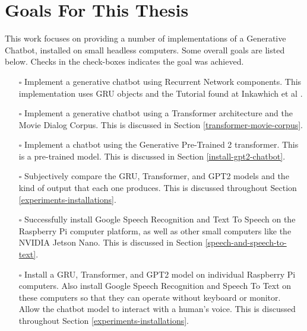 
\section{Goals For This Thesis}
This work focuses on providing a number of implementations of a Generative Chatbot, installed on small headless computers. Some overall goals are listed below. Checks in the check-boxes indicates the goal was achieved.

\begin{itemize}
	
	\item[\rlap{\raisebox{0.3ex}{\hspace{0.4ex}\tiny \ding{52}}}$\square$] Implement a generative chatbot using Recurrent Network components. This implementation uses GRU objects and the Tutorial found at Inkawhich et al \cite{2018Inkawhich}.
	
	\item[\rlap{\raisebox{0.3ex}{\hspace{0.4ex}\tiny \ding{52}}}$\square$] Implement a generative chatbot using a Transformer architecture and the Movie Dialog Corpus. This is discussed in Section \ref{transformer-movie-corpus}. %
	
	\item[\rlap{\raisebox{0.3ex}{\hspace{0.4ex}\tiny \ding{52}}}$\square$] Implement a chatbot using the Generative Pre-Trained 2 transformer. This is a pre-trained model. This is discussed in Section \ref{install-gpt2-chatbot}.
	
	\item[\rlap{\raisebox{0.3ex}{\hspace{0.4ex}\tiny \ding{52}}}$\square$] Subjectively compare the GRU, Transformer, and GPT2 models and the kind of output that each one produces. This is discussed throughout Section \ref{experiments-installations}.
	
	\item[\rlap{\raisebox{0.3ex}{\hspace{0.4ex}\tiny \ding{52}}}$\square$] Successfully install Google Speech Recognition and Text To Speech on the Raspberry Pi computer platform, as well as other small computers like the NVIDIA Jetson Nano. This is discussed in Section \ref{speech-and-speech-to-text}.
	
	\item[\rlap{\raisebox{0.3ex}{\hspace{0.4ex}\tiny \ding{52}}}$\square$] Install a GRU, Transformer, and GPT2 model on individual Raspberry Pi computers. Also install Google Speech Recognition and Speech To Text on these computers so that they can operate without keyboard or monitor. Allow the chatbot model to interact with a human's voice. This is discussed throughout Section \ref{experiments-installations}.
	

\end{itemize}

